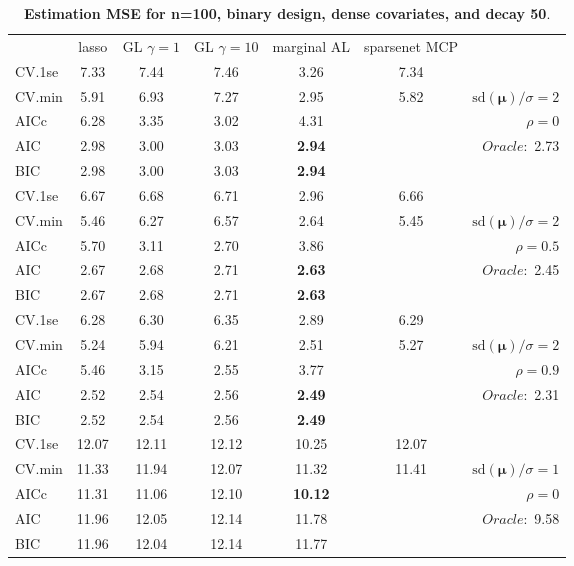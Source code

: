 \clearpage
\begin{table}\vspace{-.5cm}
\caption[l]{ { \bf Estimation MSE for n=100, binary design, 
dense covariates, and  decay  50}.}
\vspace{-.5cm}
\footnotesize{}
\begin{center}
\begin{tabular}{l*{5}{c}|r}
& lasso & GL $\gamma=1$ & GL $\gamma=10$ & marginal AL & sparsenet MCP  & \\
 \cline{1-7}
CV.1se & 7.33 & 7.44 & 7.46 & 3.26 & 7.34 & \\
CV.min & 5.91 & 6.93 & 7.27 & 2.95 & 5.82 &  $\mathrm{sd}(\mathbf{\mu})/\sigma=2$ \\
AICc & 6.28 & 3.35 & 3.02 & 4.31 & & $\rho=0$ \\
AIC & 2.98 & 3.00 & 3.03 & {\bf 2.94} & &  \multirow{2}{*}{$Oracle: $ 2.73} \\
BIC & 2.98 & 3.00 & 3.03 & {\bf 2.94} & &  \\
 \hline 
CV.1se & 6.67 & 6.68 & 6.71 & 2.96 & 6.66 & \\
CV.min & 5.46 & 6.27 & 6.57 & 2.64 & 5.45 &  $\mathrm{sd}(\mathbf{\mu})/\sigma=2$ \\
AICc & 5.70 & 3.11 & 2.70 & 3.86 & & $\rho=0.5$ \\
AIC & 2.67 & 2.68 & 2.71 & {\bf 2.63} & &  \multirow{2}{*}{$Oracle: $ 2.45} \\
BIC & 2.67 & 2.68 & 2.71 & {\bf 2.63} & &  \\
 \hline 
CV.1se & 6.28 & 6.30 & 6.35 & 2.89 & 6.29 & \\
CV.min & 5.24 & 5.94 & 6.21 & 2.51 & 5.27 &  $\mathrm{sd}(\mathbf{\mu})/\sigma=2$ \\
AICc & 5.46 & 3.15 & 2.55 & 3.77 & & $\rho=0.9$ \\
AIC & 2.52 & 2.54 & 2.56 & {\bf 2.49} & &  \multirow{2}{*}{$Oracle: $ 2.31} \\
BIC & 2.52 & 2.54 & 2.56 & {\bf 2.49} & &  \\
 \hline 
CV.1se & 12.07 & 12.11 & 12.12 & 10.25 & 12.07 & \\
CV.min & 11.33 & 11.94 & 12.07 & 11.32 & 11.41 &  $\mathrm{sd}(\mathbf{\mu})/\sigma=1$ \\
AICc & 11.31 & 11.06 & 12.10 & {\bf 10.12} & & $\rho=0$ \\
AIC & 11.96 & 12.05 & 12.14 & 11.78 & &  \multirow{2}{*}{$Oracle: $ 9.58} \\
BIC & 11.96 & 12.04 & 12.14 & 11.77 & &  \\

\end{tabular}
\end{center}
\end{table}

